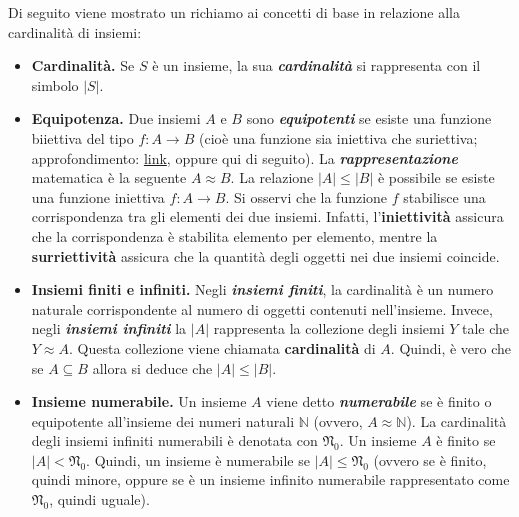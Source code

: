 \documentclass[a4paper]{article}
\begin{document}
	Di seguito viene mostrato un richiamo ai concetti di base in relazione alla cardinalità di insiemi:
	\begin{itemize}
		\item[\ding{80}] \textbf{Cardinalità.} Se $S$ è un insieme, la sua \textbf{\emph{cardinalità}} si rappresenta con il simbolo $|S|$.
	
		\item[\ding{80}] \textbf{Equipotenza.} Due insiemi $A$ e $B$ sono \textbf{\emph{equipotenti}} se esiste una funzione biiettiva del tipo $f: A \rightarrow B$ (cioè una funzione sia iniettiva che suriettiva; approfondimento: \href{https://www.youmath.it/lezioni/analisi-matematica/le-funzioni-da-r-a-r-in-generale/7-iniettivita-suriettivita-e-invertibilita-di-una-funzione-generica.html}{link}, oppure qui di seguito). \newline
		La \textbf{\emph{rappresentazione}} matematica è la seguente $A \approx B$.\newline
		La relazione $|A| \le |B|$ è possibile se esiste una funzione iniettiva $f: A \rightarrow B$. Si osservi che la funzione $f$ stabilisce una corrispondenza tra gli elementi dei due insiemi. Infatti, l'\textbf{iniettività} assicura che la corrispondenza è stabilita elemento per elemento, mentre la \textbf{surriettività} assicura che la quantità degli oggetti nei due insiemi coincide.
	
		\item[\ding{80}] \textbf{Insiemi finiti e infiniti.} Negli \textbf{\emph{insiemi finiti}}, la cardinalità è un numero naturale corrispondente al numero di oggetti contenuti nell'insieme.\newline
		Invece, negli \textbf{\emph{insiemi infiniti}} la $|A|$ rappresenta la collezione degli insiemi $Y$ tale che $Y \approx A$. Questa collezione viene chiamata \textbf{cardinalità} di $A$. Quindi, è vero che se $A \subseteq B$ allora si deduce che $|A| \le |B|$.
		
		\item[\ding{80}] \textbf{Insieme numerabile.} Un insieme $A$ viene detto \textbf{\emph{numerabile}} se è finito o equipotente all'insieme dei numeri naturali $\mathbb{N}$ (ovvero, $A \approx \mathbb{N}$). \newline
		La cardinalità degli insiemi infiniti numerabili è denotata con $\mathfrak{N}_0$. \newline
		Un insieme $A$ è finito se $|A| < \mathfrak{N}_0$. Quindi, un insieme è numerabile se $|A| \le \mathfrak{N}_0$ (ovvero se è finito, quindi minore, oppure se è un insieme infinito numerabile rappresentato come $\mathfrak{N}_0$, quindi uguale).
	\end{itemize}
	
\end{document}
